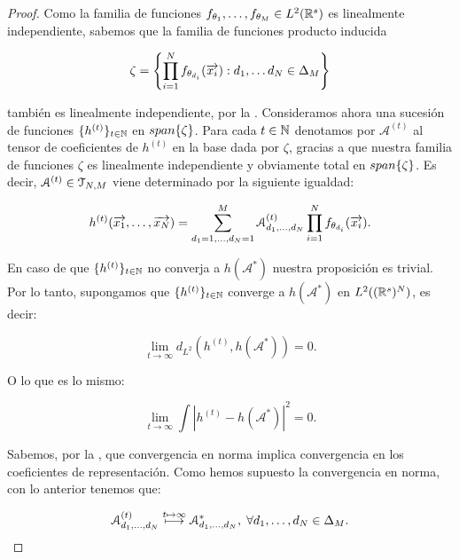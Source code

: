 \begin{proof}
    Como la familia de funciones $f_{\theta_1}, \ldots, f_{\theta_M} \in L^2(\mathbb{R}^s)$ es linealmente independiente, sabemos que la familia de funciones producto inducida

    \begin{equation}
        \zeta = \left \{ \prod_{i = 1}^N f_{\theta_{d_i}}(\overrightarrow{x_i}): d_1, \ldots d_N \in \Delta_{M} \right\}
    \end{equation}

    también es linealmente independiente, por la . Consideramos ahora una sucesión de funciones $\{ h^{(t)} \}_{t \in \mathbb{N}}$ en $span\{ \zeta \}$. Para cada $t \in \mathbb{N}$ denotamos por $\mathcal{A}^{(t)}$ al tensor de coeficientes de $h^{(t)}$ en la base dada por $\zeta$, gracias a que nuestra familia de funciones $\zeta$ es linealmente independiente y obviamente total en $span \{ \zeta \}$. Es decir, $\mathcal{A}^{(t)} \in \mathcal{T}_{N, M}$ viene determinado por la siguiente igualdad:

    \begin{equation}
        h^{(t)}(\overrightarrow{x_1}, \ldots, \overrightarrow{x_N}) = \sum_{d_1 = 1, \ldots, d_N = 1}^M \mathcal{A}^{(t)}_{d_1, \ldots, d_N} \prod_{i = 1}^N f_{\theta_{d_i}}(\overrightarrow{x_i}).
    \end{equation}

    En caso de que $\{ h^{(t)} \}_{t \in \mathbb{N}}$ no converja a $h(\mathcal{A}^*)$ nuestra proposición es trivial. Por lo tanto, supongamos que $\{ h^{(t)} \}_{t \in \mathbb{N}}$ converge a $h(\mathcal{A}^*)$ en $L^2((\mathbb{R}^s)^N)$, es decir:

    \begin{equation}
        \lim_{t \to \infty} d_{L^2}(h^{(t)}, h(\mathcal{A}^*)) = 0.
    \end{equation}

    O lo que es lo mismo:

    \begin{equation}
        \lim_{t \to \infty} \int | h^{(t)} - h(\mathcal{A}^*)|^2 = 0.
    \end{equation}

    Sabemos, por la , que convergencia en norma implica convergencia en los coeficientes de representación. Como hemos supuesto la convergencia en norma, con lo anterior tenemos que:

    \begin{equation}
        \mathcal{A}^{(t)}_{d_1, \ldots, d_N} \stackrel{t \mapsto \infty}{\longmapsto} \mathcal{A}^*_{d_1, \ldots, d_N},
        \; \forall d_1, \ldots, d_N \in \Delta_{M}.
    \end{equation}


\end{proof}
